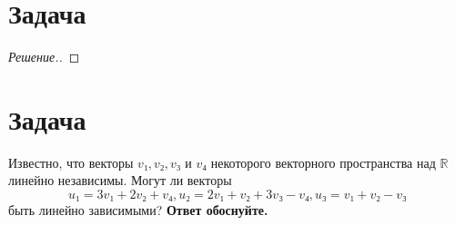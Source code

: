 \documentclass[a4paper]{article}
\theoremstyle{remark}
\begin{document}
    \section*{Задача }
	    \begin{proof}[Решение.]
		
        \end{proof}
    
    \section*{Задача }
      Известно, что векторы  $v₁, v₂, v₃$ и $v₄$ некоторого векторного
      пространства над $\mathbb{R}$ линейно независимы. Могут ли
      векторы \\
      \[u₁ = 3v₁ + 2v₂ + v₄, u₂ = 2v₁ + v₂ + 3v₃ - v₄,
       u₃ = v₁ + v₂ - v₃ \] 
       быть линейно зависимыми? \textbf{Ответ обоснуйте.}
\end{document}
